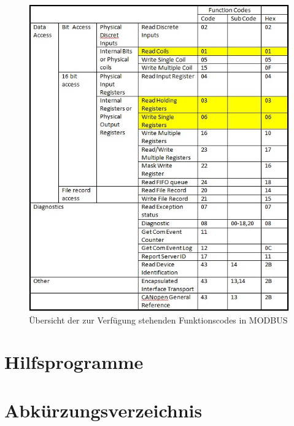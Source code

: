 \begin{figure}[hbtp]
\centering
\includegraphics[scale=0.65]{modbus/fcodetab}
\caption{Übersicht der zur Verfügung stehenden Funktionscodes in MODBUS}
\label{fig:fcodetab}
\end{figure} 
\chapter{Hilfsprogramme}

\chapter{Abkürzungsverzeichnis}

